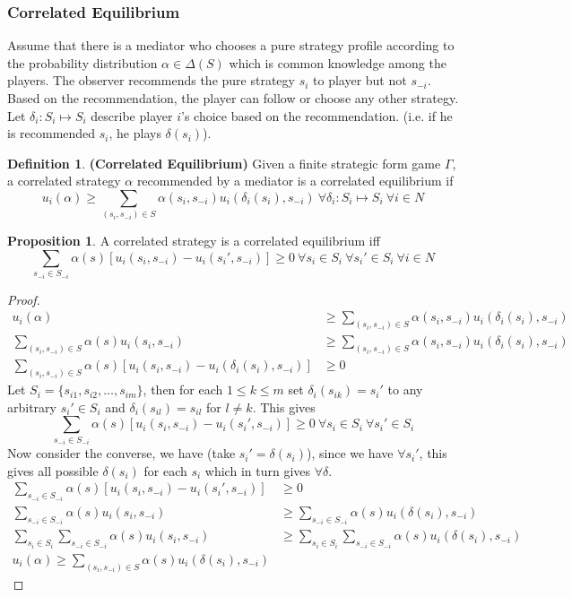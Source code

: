 \documentclass{article}
\theoremstyle{definition}
\newtheorem{defn}{Definition}[section]
\newtheorem{prop}{Proposition}[section]
\begin{document}
\subsubsection{Correlated Equilibrium}
Assume that there is a mediator who chooses a pure strategy profile according to the probability distribution $\alpha \in \Delta(S)$ which is common knowledge among the players. The observer recommends the pure strategy $s_i$ to player but not $s_{-i}$. Based on the recommendation, the player can follow or choose any other strategy. Let $\delta_i:S_i\mapsto S_i$ describe player $i$'s choice based on the recommendation. (i.e. if he is recommended $s_i$, he plays $\delta(s_i)$).
\begin{defn}
\textbf{(Correlated Equilibrium)} Given a finite strategic form game $\Gamma$, a correlated strategy $\alpha$ recommended by a mediator is a correlated equilibrium if $$u_i(\alpha) \geq \sum_{(s_i,s_{-i})\in S} \alpha(s_i,s_{-i}) u_i(\delta_i(s_i),s_{-i})~\forall \delta_i:S_i\mapsto S_i~\forall i\in N$$ 
\end{defn}
\begin{prop}
A correlated strategy is a correlated equilibrium iff $$\sum_{s_{-i}\in S_{-i}} \alpha(s)[u_i(s_i,s_{-i}) - u_i(s_i',s_{-i})]\geq 0 ~\forall s_i\in S_i~\forall s_i'\in S_i~\forall i \in N$$
\end{prop}
\begin{proof}
\begin{align*}
u_i(\alpha) &\geq \sum_{(s_i,s_{-i})\in S} \alpha(s_i,s_{-i}) u_i(\delta_i(s_i),s_{-i})\\
\sum_{(s_i,s_{-i})\in S} \alpha(s)u_i(s_i,s_{-i}) &\geq \sum_{(s_i,s_{-i})\in S} \alpha(s_i,s_{-i}) u_i(\delta_i(s_i),s_{-i})\\
\sum_{(s_i,s_{-i})\in S} \alpha(s)[u_i(s_i,s_{-i}) - u_i(\delta_i(s_i),s_{-i})] &\geq 0
\end{align*}
Let $S_i = \{s_{i1},s_{i2},\dots, s_{im}\}$, then for each $1\leq k\leq m$ set $\delta_i(s_{ik}) = s_i'$ to any arbitrary $s_i' \in S_i$ and $\delta_i(s_{il}) = s_{il}$ for $l \neq k$. This gives $$\sum_{s_{-i}\in S_{-i}} \alpha(s)[u_i(s_i,s_{-i}) - u_i(s_i',s_{-i})]\geq 0 ~\forall s_i\in S_i~\forall s_i'\in S_i$$
Now consider the converse, we have (take $s_i' = \delta(s_i)$), since we have $\forall s_i'$, this gives all possible $\delta(s_i)$ for each $s_i$ which in turn gives $\forall \delta$.
\begin{align*}
\sum_{s_{-i}\in S_{-i}} \alpha(s)[u_i(s_i,s_{-i}) - u_i(s_i',s_{-i})]&\geq 0\\
\sum_{s_{-i}\in S_{-i}} \alpha(s)u_i(s_i,s_{-i}) &\geq \sum_{s_{-i}\in S_{-i}} \alpha(s)u_i(\delta(s_i),s_{-i})\\
\sum_{s_i\in S_i}\sum_{s_{-i}\in S_{-i}} \alpha(s)u_i(s_i,s_{-i}) &\geq \sum_{s_i\in S_i}\sum_{s_{-i}\in S_{-i}} \alpha(s)u_i(\delta(s_i),s_{-i})\\
u_i(\alpha) \geq \sum_{(s_i,s_{-i})\in S} \alpha(s)u_i(\delta(s_i),s_{-i})
\end{align*}
\end{proof}
\end{document}
